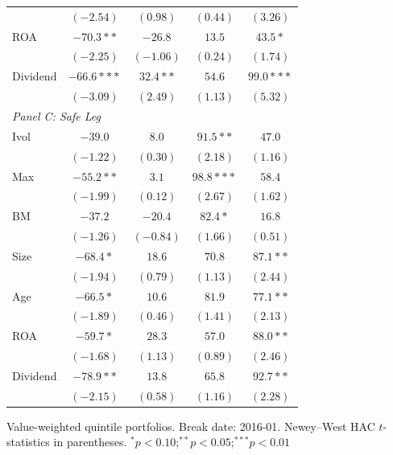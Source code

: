 \begin{table}[htbp]
\begin{tabular}{l c c c c}
 & $(-2.54)$ & $(0.98)$ & $(0.44)$ & $(3.26)$ \\
ROA & $-70.3**$ & $-26.8$ & $13.5$ & $43.5*$ \\
 & $(-2.25)$ & $(-1.06)$ & $(0.24)$ & $(1.74)$ \\
Dividend & $-66.6***$ & $32.4**$ & $54.6$ & $99.0***$ \\
 & $(-3.09)$ & $(2.49)$ & $(1.13)$ & $(5.32)$ \\
\midrule
\multicolumn{5}{l}{\textit{Panel C: Safe Leg}} \\
Ivol & $-39.0$ & $8.0$ & $91.5**$ & $47.0$ \\
 & $(-1.22)$ & $(0.30)$ & $(2.18)$ & $(1.16)$ \\
Max & $-55.2**$ & $3.1$ & $98.8***$ & $58.4$ \\
 & $(-1.99)$ & $(0.12)$ & $(2.67)$ & $(1.62)$ \\
BM & $-37.2$ & $-20.4$ & $82.4*$ & $16.8$ \\
 & $(-1.26)$ & $(-0.84)$ & $(1.66)$ & $(0.51)$ \\
Size & $-68.4*$ & $18.6$ & $70.8$ & $87.1**$ \\
 & $(-1.94)$ & $(0.79)$ & $(1.13)$ & $(2.44)$ \\
Age & $-66.5*$ & $10.6$ & $81.9$ & $77.1**$ \\
 & $(-1.89)$ & $(0.46)$ & $(1.41)$ & $(2.13)$ \\
ROA & $-59.7*$ & $28.3$ & $57.0$ & $88.0**$ \\
 & $(-1.68)$ & $(1.13)$ & $(0.89)$ & $(2.46)$ \\
Dividend & $-78.9**$ & $13.8$ & $65.8$ & $92.7**$ \\
 & $(-2.15)$ & $(0.58)$ & $(1.16)$ & $(2.28)$ \\
\bottomrule
\end{tabular}
\vspace{4pt}
\begin{minipage}{0.9\textwidth}
\footnotesize
Value-weighted quintile portfolios. Break date: 2016-01.
Newey--West HAC $t$-statistics in parentheses.
$^{*}p<0.10$;\quad $^{**}p<0.05$;\quad $^{***}p<0.01$
\end{minipage}
\end{table}

